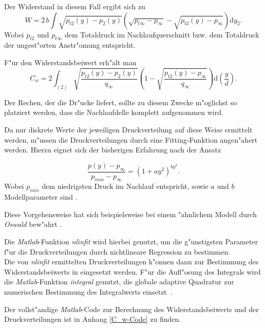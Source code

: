 Der Widerstand in diesem Fall ergibt sich zu
\begin{equation}
	\label{eq:widerstand_korrigiert}
	W = 2\,b \int \sqrt{p_{t2}(y) - p_2(y)} \left(\sqrt{p_{t\infty} - p_{\infty}} - \sqrt{p_{t2}(y) - p_{\infty}}\right) \mathrm{d} y_2 .
\end{equation}
Wobei $p_{t2}$ und $p_{t\infty}$ dem Totaldruck im Nachlaufquerschnitt bzw. dem Totaldruck der ungest"orten Anstr"omung entspricht.

F"ur den Widerstandsbeiwert erh"alt man
\begin{equation}
	\label{eq:C_w_korrigiert}
	C_w = 2 \int_{(2)} \sqrt{\frac{p_{t2}(y) - p_2(y)}{q_{\infty}}}
	\left(1 - \sqrt{\frac{p_{t2}(y) - p_{\infty}}{q_{\infty}}}\right)  \mathrm{d}\left(\frac{y}{d}\right).
\end{equation}

Der Rechen, der die Dr"ucke liefert, sollte zu diesem Zwecke m"oglichst so platziert werden, dass die Nachlaufdelle komplett aufgenommen wird. 

Da nur diskrete Werte der jeweiligen Druckverteilung auf diese Weise ermittelt werden, m"ussen die Druckverteilungen durch eine Fitting-Funktion angen"ahert werden. 
Hierzu eignet sich der bisherigen Erfahrung nach der Ansatz

	\begin{equation}
	\label{eq:fitting-function}
	\frac{p(y) - p_{\infty}}{p_{min}-p_{\infty}} = (1 +ay^2)^{by^2}.
	\end{equation}
Wobei $p_{min}$ dem niedrigsten Druck im Nachlauf entspricht, sowie $a$ und $b$ Modellparameter sind \cite{Oswald.2017}.

Diese Vorgehensweise hat sich beispielsweise bei einem "ahnlichem Modell durch \textit{Oswald} bew"ahrt \cite{Oswald.2017}.

Die \textit{Matlab}-Funktion \textit{nlinfit} wird hierbei genutzt, um die g"unstigsten Parameter f"ur die Druckverteilungen durch nichtlineare Regression zu bestimmen.\\
Die von \textit{nlinfit} ermittelten Druckverteilungen k"onnen dann zur Bestimmung des Widerstandsbeiwerts in  eingesetzt werden.
F"ur die Aufl"osung des Integrals wird die \textit{Matlab}-Funktion \textit{integral} genutzt, die globale adaptive Quadratur zur numerischen Bestimmung des Integralwerts einsetzt~\cite{Oswald.2017}.

Der vollst"andige \textit{Matlab}-Code zur Berechnung des Widerstandsbeiwerts und der Druckverteilungen ist in Anhang \ref{C_w-Code} zu finden. 

